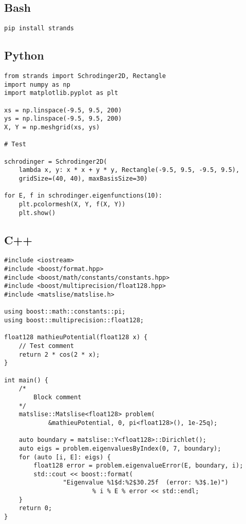 

\subsection{Bash}

\begin{verbatim}
pip install strands
\end{verbatim}

\subsection{Python}
\begin{verbatim}
from strands import Schrodinger2D, Rectangle
import numpy as np
import matplotlib.pyplot as plt

xs = np.linspace(-9.5, 9.5, 200)
ys = np.linspace(-9.5, 9.5, 200)
X, Y = np.meshgrid(xs, ys)

# Test

schrodinger = Schrodinger2D(
    lambda x, y: x * x + y * y, Rectangle(-9.5, 9.5, -9.5, 9.5),
    gridSize=(40, 40), maxBasisSize=30)

for E, f in schrodinger.eigenfunctions(10):
    plt.pcolormesh(X, Y, f(X, Y))
    plt.show()
\end{verbatim}

\subsection{C++}
\begin{verbatim}
#include <iostream>
#include <boost/format.hpp>
#include <boost/math/constants/constants.hpp>
#include <boost/multiprecision/float128.hpp>
#include <matslise/matslise.h>

using boost::math::constants::pi;
using boost::multiprecision::float128;

float128 mathieuPotential(float128 x) {
    // Test comment
    return 2 * cos(2 * x);
}

int main() {
    /*
        Block comment
    */
    matslise::Matslise<float128> problem(
            &mathieuPotential, 0, pi<float128>(), 1e-25q);

    auto boundary = matslise::Y<float128>::Dirichlet();
    auto eigs = problem.eigenvaluesByIndex(0, 7, boundary);
    for (auto [i, E]: eigs) {
        float128 error = problem.eigenvalueError(E, boundary, i);
        std::cout << boost::format(
                "Eigenvalue %1$d:%2$30.25f  (error: %3$.1e)")
                        % i % E % error << std::endl;
    }
    return 0;
}
\end{verbatim}

\stopchapter
